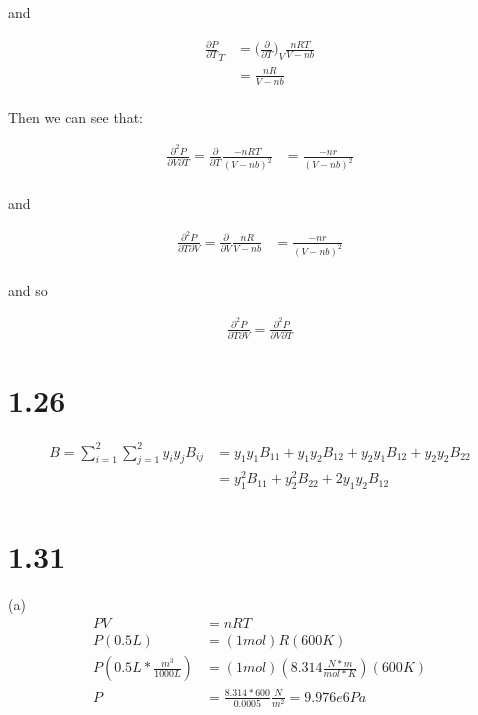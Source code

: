 \documentclass[10pt]{article} %
\begin{document}
and

\begin{align}
  \frac{\partial P}{\partial T}_T &= \big(\frac{\partial}{\partial T}\big)_V \frac{nRT}{V-nb}\\
  &= \frac{nR}{V-nb}\\
\end{align}

Then we can see that:

\begin{align}
  \frac{\partial^2P}{\partial V\partial T} = \frac{\partial}{\partial T} \frac{-nRT}{(V-nb)^2}
  &= \frac{-nr}{(V-nb)^2}\\
\end{align}

and

\begin{align}
  \frac{\partial^2P}{\partial T\partial V} = \frac{\partial}{\partial V} \frac{nR}{V-nb}
  &= \frac{-nr}{(V-nb)^2}\\
\end{align}

and so

\begin{align}
  \frac{\partial^2P}{\partial T\partial V} = \frac{\partial^2P}{\partial V\partial T}
\end{align}

\section{1.26}
\begin{align}
  B = \sum_{i=1}^2\sum_{j=1}^2y_iy_jB_{ij} &= y_1y_1B_{11}+y_1y_2B_{12}+y_2y_1B_{12}+y_2y_2B_{22}\\
  &= y_1^2B_{11}+y_2^2B_{22}+2y_1y_2B_{12}\\
\end{align}

\section{1.31}
(a)\\
\begin{align}
  PV&=nRT\\
  P(0.5L) &= (1 mol)R(600K)\\
  P(0.5L * \frac{m^3}{1000L}) &= (1 mol)(8.314 \frac{N*m}{mol*K})(600K)\\
  P &= \frac{8.314*600}{0.0005} \frac{N}{m^2} = 9.976e6 Pa\\
\end{align}
\end{document}
